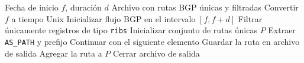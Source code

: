 \begin{algorithm}[H]
\caption{Extracción y filtrado inicial de rutas BGP}
\label{alg:bgp_extraccion_filtrado}
\begin{algorithmic}[1]
\Require Fecha de inicio $f$, duración $d$
\Ensure Archivo con rutas BGP únicas y filtradas
\State Convertir $f$ a tiempo Unix
\State Inicializar flujo BGP en el intervalo $[f, f+d]$
\State Filtrar únicamente registros de tipo \texttt{ribs}
\State Inicializar conjunto de rutas únicas $P$
        \State Extraer \texttt{AS\_PATH} y prefijo
            \State Continuar con el siguiente elemento
        \EndIf
            \State Guardar la ruta en archivo de salida
            \State Agregar la ruta a $P$
        \EndIf
    \EndFor
\EndFor
\State Cerrar archivo de salida
\end{algorithmic}
\end{algorithm}











